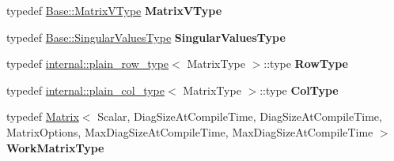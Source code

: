 \begin{DoxyCompactItemize}
typedef \mbox{\hyperlink{class_eigen_1_1_matrix}{Base\+::\+Matrix\+V\+Type}} {\bfseries Matrix\+V\+Type}
\item 
\mbox{\label{class_eigen_1_1_jacobi_s_v_d_aa984693f000ee4bb8b97a8745ce4fc3f}} 
typedef \mbox{\hyperlink{struct_eigen_1_1internal_1_1true__type}{Base\+::\+Singular\+Values\+Type}} {\bfseries Singular\+Values\+Type}
\item 
\mbox{\label{class_eigen_1_1_jacobi_s_v_d_a207a070b273d496fed8ae023dc65bc1d}} 
typedef \mbox{\hyperlink{struct_eigen_1_1internal_1_1plain__row__type}{internal\+::plain\+\_\+row\+\_\+type}}$<$ Matrix\+Type $>$\+::type {\bfseries Row\+Type}
\item 
\mbox{\label{class_eigen_1_1_jacobi_s_v_d_aa0f11b5e8b126ff21937e8a08781a50d}} 
typedef \mbox{\hyperlink{struct_eigen_1_1internal_1_1plain__col__type}{internal\+::plain\+\_\+col\+\_\+type}}$<$ Matrix\+Type $>$\+::type {\bfseries Col\+Type}
\item 
\mbox{\label{class_eigen_1_1_jacobi_s_v_d_a2340597ffb613aec7aeff16310d19639}} 
typedef \mbox{\hyperlink{class_eigen_1_1_matrix}{Matrix}}$<$ Scalar, Diag\+Size\+At\+Compile\+Time, Diag\+Size\+At\+Compile\+Time, Matrix\+Options, Max\+Diag\+Size\+At\+Compile\+Time, Max\+Diag\+Size\+At\+Compile\+Time $>$ {\bfseries Work\+Matrix\+Type}
\end{DoxyCompactItemize}
